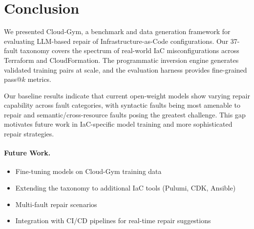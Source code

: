 \section{Conclusion}
\label{sec:conclusion}

We presented Cloud-Gym, a benchmark and data generation framework for evaluating LLM-based repair of Infrastructure-as-Code configurations. Our 37-fault taxonomy covers the spectrum of real-world IaC misconfigurations across Terraform and CloudFormation. The programmatic inversion engine generates validated training pairs at scale, and the evaluation harness provides fine-grained pass@$k$ metrics.

Our baseline results indicate that current open-weight models show varying repair capability across fault categories, with syntactic faults being most amenable to repair and semantic/cross-resource faults posing the greatest challenge. This gap motivates future work in IaC-specific model training and more sophisticated repair strategies.

\paragraph{Future Work.}
\begin{itemize}
    \item Fine-tuning models on Cloud-Gym training data
    \item Extending the taxonomy to additional IaC tools (Pulumi, CDK, Ansible)
    \item Multi-fault repair scenarios
    \item Integration with CI/CD pipelines for real-time repair suggestions
\end{itemize}

